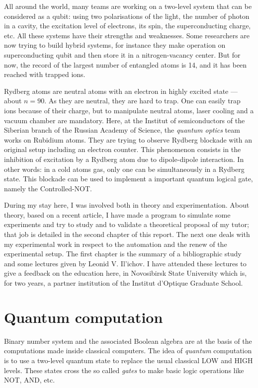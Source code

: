 \documentclass[%
]{scrreprt}
\begin{document}
\par All around the world, many teams are working on a two-level system that can be considered as a qubit: using two polarisations of the light, the number of photon in a cavity, the excitation level of electrons, its spin, the superconducting charge, etc. All these systems have their strengths and weaknesses. Some researchers are now trying to build hybrid systems, for instance they make operation on superconducting qubit and then store it in a nitrogen-vacancy center. But for now, the record of the largest number of entangled atoms is 14, and it has been reached with trapped ions.

\par Rydberg atoms are neutral atoms with an electron in highly excited state --- about $n=90$. As they are neutral, they are hard to trap. One can easily trap ions because of their charge, but to manipulate neutral atoms, laser cooling and a vacuum chamber are mandatory. Here, at the Institut of semiconductors of the Siberian branch of the Russian Academy of Science, the \emph{quantum optics} team works on Rubidium atoms. They are trying to observe Rydberg blockade with an original setup including an electron counter. This phenomenon consists in the inhibition of excitation by a Rydberg atom due to dipole-dipole interaction. In other words: in a cold atoms gas, only one can be simultaneously in a Rydberg state. This blockade can be used to implement a important quantum logical gate, namely the Controlled-NOT.

\par During my stay here, I was involved both in theory and experimentation. About theory, based on a recent article, I have made a program to simulate some experiments and try to study and to validate a theoretical proposal of my tutor; that job is detailed in the second chapter of this report. The next one deals with my experimental work in respect to the automation and the renew of the experimental setup. The first chapter is the summary of a bibliographic study and some lectures given by Leonid V. Il'ichov. I have attended these lectures to give a feedback on the education here, in Novosibirsk State University which is, for two years, a partner institution of the Institut d'Optique Graduate School.


\chapter{Quantum computation}

\par Binary number system and the associated Boolean algebra are at the basis of the computations made inside classical computers. The idea of \emph{quantum} computation is to use a two-level quantum state to replace the usual classical LOW and HIGH levels. These states cross the so called \emph{gates} to make basic logic operations like NOT, AND, etc.
\end{document}
